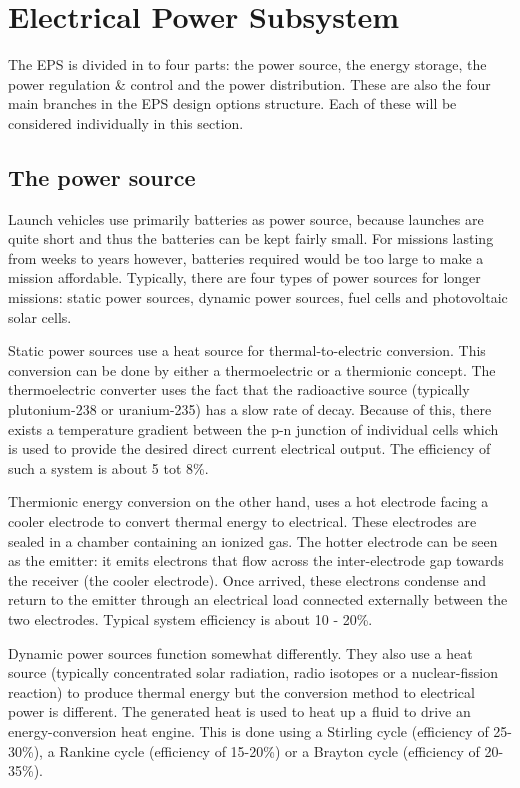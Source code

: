 \section{Electrical Power Subsystem}
\label{blDOEPS}

The \ac{EPS} is divided in to four parts: the power source, the energy storage, the power regulation \& control and the power distribution. These are also the four main branches in the \ac{EPS} design options structure. Each of these will be considered individually in this section.

\subsection{The power source}
\label{blDOsource}

Launch vehicles use primarily batteries as power source, because launches are quite short and thus the batteries can be kept fairly small. For missions lasting from weeks to years however, batteries required would be too large to make a mission affordable. Typically, there are four types of power sources for longer missions: static power sources, dynamic power sources, fuel cells and photovoltaic solar cells. 

Static power sources use a heat source for thermal-to-electric conversion. This conversion can be done by either a thermoelectric or a thermionic concept. The thermoelectric converter uses the fact that the radioactive source (typically plutonium-238 or uranium-235) has a slow rate of decay. Because of this, there exists a temperature gradient between the p-n junction of individual cells which is used to provide the desired direct current electrical output. The efficiency of such a system is about 5 tot 8\%.

Thermionic energy conversion on the other hand, uses a hot electrode facing a cooler electrode to convert thermal energy to electrical. These electrodes are sealed in a chamber containing an ionized gas. The hotter electrode can be seen as the emitter: it emits electrons that flow across the inter-electrode gap towards the receiver (the cooler electrode). Once arrived, these electrons condense and return to the emitter through an electrical load connected externally between the two electrodes. Typical system efficiency is about 10 - 20\%.

Dynamic power sources function somewhat differently. They also use a heat source (typically concentrated solar radiation, radio isotopes or a nuclear-fission reaction) to produce thermal energy but the conversion method to electrical power is different. The generated heat is used to heat up a fluid to drive an energy-conversion heat engine. This is done using a Stirling cycle (efficiency of 25-30\%), a Rankine cycle (efficiency of 15-20\%) or a Brayton cycle (efficiency of 20-35\%).

